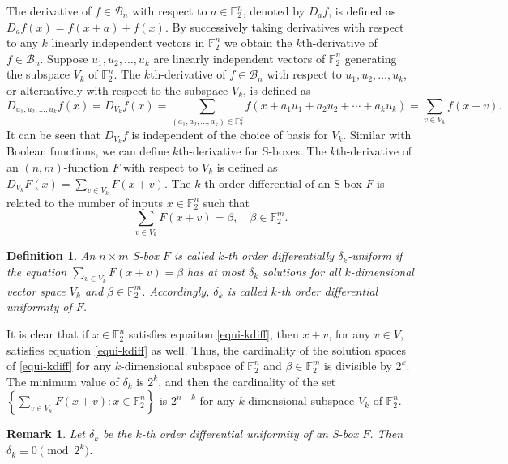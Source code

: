 \documentclass[12 pt]{article}
\newtheorem{definition}{Definition}
\newtheorem{remark}{Remark}
\def\F{{\mathbb F}}
\begin{document}
  The derivative of $f\in\mathcal{B}_n$ with respect to $a\in\F_2^n$, denoted by $D_af$, is defined as $D_af(x)=f(x+a)+f(x)$. 
  By successively taking derivatives with respect to any $k$ linearly independent vectors in $\F_2^n$ we obtain the $k$th-derivative of $f\in\mathcal{B}_n$. 
  Suppose $u_1,u_2,\ldots,u_k$ are linearly independent vectors of $\F_2^n$ generating the subspace $V_k$ of $\F_2^n$. The $k$th-derivative of $f\in\mathcal{B}_n$ with respect to $u_1,u_2,\ldots,u_k$, or alternatively with respect to the subspace $V_k$, is defined as
  \begin{equation*} \label{kderiv}
    D_{u_1,u_2,\ldots,u_k}f(x)=D_{V_k}f(x)=\sum_{(a_1,a_2,\ldots,a_k)\in\F_2^k}f(x+a_1u_1+a_2u_2+\cdots+a_ku_k)=\sum_{v\in V_k}f(x+v).
  \end{equation*}
  It can be seen that $D_{V_k}f$ is independent of the choice of basis for $V_k$. 
  Similar with Boolean functions, we can define $k$th-derivative for S-boxes. 
  The $k$th-derivative of an $(n,m)$-function $F$ with respect to $V_k$ is defined as $D_{V_k}F(x)=\sum_{v\in V_k}F(x+v)$. 
  The $k$-th order differential of an S-box $F$ \cite[Definition 4.2]{LRK95} is related to the number of inputs $x\in\F_2^n$ such that
  \begin{equation}\label{equi-kdiff}
    \sum_{v\in V_k}F(x+v)=\beta,\quad\beta\in\F_2^m.
  \end{equation}
  \begin{definition}\label{d1}
    An $n\times m$ S-box $F$ is called $k$-th order differentially $\delta_k$-uniform if the equation $\sum_{v\in V_k}F(x+v) = \beta$ has at most $\delta_k$ solutions for all $k$-dimensional vector space $V_k$ and $\beta\in\F_2^m$. 
    Accordingly, $\delta_k$ is called $k$-th order differential uniformity of $F$. 
  \end{definition}
  It is clear that if $x\in\F_2^n$ satisfies equaiton \eqref{equi-kdiff}, then $x+v$, for any $v\in V$, satisfies equation \eqref{equi-kdiff} as well. 
  Thus, the cardinality of the solution spaces of \eqref{equi-kdiff} for any $k$-dimensional subspace of $\F_2^n$ and $\beta\in\F_2^m$ is divisible by $2^k$. 
  The minimum value of $\delta_k$ is $2^k$, and then the cardinality of the set $\left\{ \sum_{v\in V_k}F(x+v): x\in\F_2^n \right\}$ is $2^{n-k}$ for any $k$ dimensional subspace $V_k$ of $\F_2^n$.
  \begin{remark}
    Let $\delta_k$ be the $k$-th order differential uniformity of an S-box $F$. Then $\delta_k\equiv 0\pmod{2^k}$.
  \end{remark}
\end{document}
